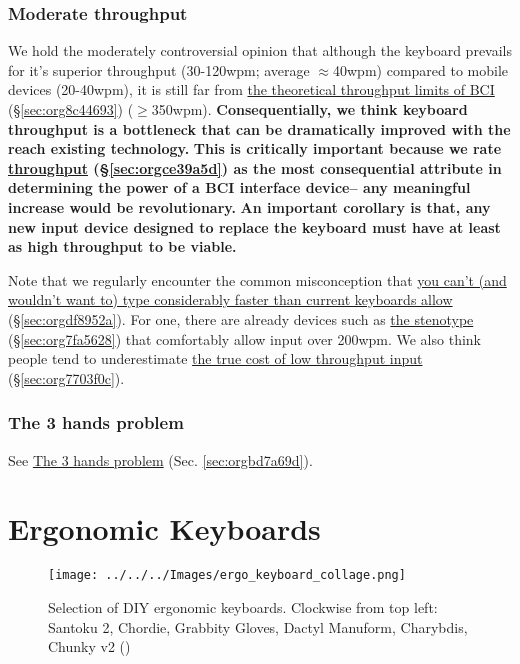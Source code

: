\documentclass[logo,bsc,singlespacing,parskip]{infthesis}
\begin{document}
\subsection{Moderate throughput}
\label{sec:orgb228048}
We hold the moderately controversial opinion that although the keyboard prevails for it's superior throughput (30-120wpm; average \(\approx\)40wpm) compared to mobile devices (20-40wpm), it is still far from \hyperref[sec:org8c44693]{the theoretical throughput limits of BCI} (\S \ref{sec:org8c44693}) (\(\ge\)350wpm).
\textbf{Consequentially, we think keyboard throughput is a bottleneck that can be dramatically improved with the reach existing technology.}
\textbf{This is critically important because we rate \hyperref[sec:orgce39a5d]{throughput} (\S \ref{sec:orgce39a5d}) as the most consequential attribute in determining the power of a BCI interface device-- any meaningful increase would be revolutionary.}
\textbf{An important corollary is that, any new input device designed to replace the keyboard must have at least as high throughput to be viable.}

Note that we regularly encounter the common misconception that \hyperref[sec:orgdf8952a]{you can't (and wouldn't want to) type considerably faster than current keyboards allow} (\S \ref{sec:orgdf8952a}).
For one, there are already devices such as \hyperref[sec:org7fa5628]{the stenotype} (\S \ref{sec:org7fa5628}) that comfortably allow input over 200wpm.
We also think people tend to underestimate \hyperref[sec:org7703f0c]{the true cost of low throughput input} (\S \ref{sec:org7703f0c}).

\subsection{The 3 hands problem}
\label{sec:org958755f}
See \hyperref[sec:orgbd7a69d]{The 3 hands problem} (Sec. \ref{sec:orgbd7a69d}).

\chapter{Ergonomic Keyboards}
\label{sec:org2de285b}
\begin{figure}[h]
\centering
\texttt{[image: ../../../Images/ergo\_keyboard\_collage.png]}
\caption[Collage of ergonomic keyboards]{\label{fig:ergo_collage}Selection of DIY ergonomic keyboards. Clockwise from top left: Santoku 2, Chordie, Grabbity Gloves, Dactyl Manuform, Charybdis, Chunky v2  (\autocite{ErgoMechBoards})}
\end{figure}
\end{document}
